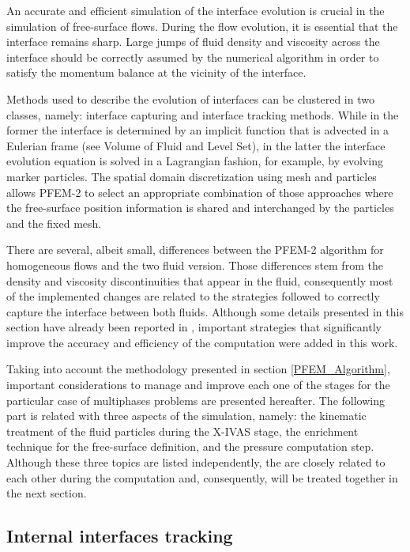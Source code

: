 An accurate and efficient simulation of the interface evolution is crucial in the simulation of free-surface flows. During the flow evolution, it is essential that the interface remains sharp. Large jumps of fluid density and viscosity across the interface should be correctly assumed by the numerical algorithm in order to satisfy the momentum balance at the vicinity of the interface.

Methods used to describe the evolution of interfaces can be clustered in two classes, namely: interface capturing and interface tracking methods. While in the former the interface is determined by an implicit function that is advected in a Eulerian frame (see Volume of Fluid \cite{VoF} and Level Set\cite{Osher01}), in the latter the interface evolution equation is solved in a Lagrangian fashion, for example, by evolving marker particles. The spatial domain discretization using mesh and particles allows PFEM-2 to select an appropriate combination of those approaches where the free-surface position information is shared and interchanged by the particles and the fixed mesh.

There are several, albeit small, differences between the PFEM-2 algorithm for homogeneous flows and the two fluid version. Those differences stem from the density and viscosity discontinuities that appear in the fluid, consequently most of the implemented changes are related to the strategies followed to correctly capture the interface between both fluids. Although some details presented in this section have already been reported in \cite{Idelsohn13c}, important strategies that significantly improve the accuracy and efficiency of the computation were added in this work.

Taking into account the methodology presented in section \ref{PFEM_Algorithm}, important considerations to manage and improve each one of the stages for the particular case of multiphases problems are presented hereafter. The following part is related with three aspects of the simulation, namely: the kinematic treatment of the fluid particles during the X-IVAS stage, the enrichment technique for the free-surface definition, and the pressure computation step. Although these three topics are listed independently, the are closely related to each other during the computation and, consequently, will be treated together in the next section.

\subsection{Internal interfaces tracking}\label{sec:tracking}

